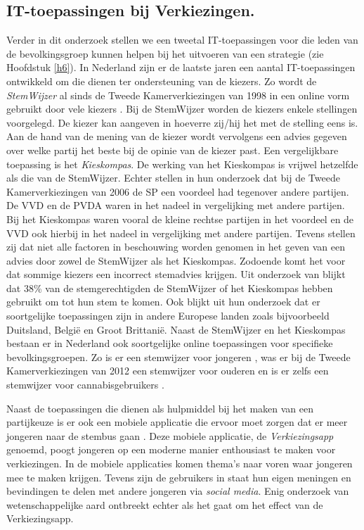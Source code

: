 \subsection{IT-toepassingen bij Verkiezingen.}
Verder in dit onderzoek stellen we een tweetal IT-toepassingen voor die leden van de bevolkingsgroep kunnen helpen bij het uitvoeren van een strategie (zie Hoofdstuk \ref{h6}). In Nederland zijn er de laatste jaren een aantal IT-toepassingen ontwikkeld om die dienen ter ondersteuning van de kiezers. Zo wordt de \textit{StemWijzer} al sinds de Tweede Kamerverkiezingen van 1998 in een online vorm gebruikt door vele kiezers \citep{kleinnijenhuis2007nederland}. Bij de StemWijzer worden de kiezers enkele stellingen voorgelegd. De kiezer kan aangeven in hoeverre zij/hij het met de stelling eens is. Aan de hand van de mening van de kiezer wordt vervolgens een advies gegeven over welke partij het beste bij de opinie van de kiezer past. Een vergelijkbare toepassing is het \textit{Kieskompas}. De werking van het Kieskompas is vrijwel hetzelfde als die van de StemWijzer. Echter stellen \cite{kleinnijenhuis2007nederland} in hun onderzoek dat bij de Tweede Kamerverkiezingen van 2006 de SP een voordeel had tegenover andere partijen. De VVD en de PVDA waren in het nadeel in vergelijking met andere partijen. Bij het Kieskompas waren vooral de kleine rechtse partijen in het voordeel en de VVD ook hierbij in het nadeel in vergelijking met andere partijen. Tevens stellen zij dat niet alle factoren in beschouwing worden genomen in het geven van een advies door zowel de StemWijzer als het Kieskompas. Zodoende komt het voor dat sommige kiezers een incorrect stemadvies krijgen. Uit onderzoek van \cite{garzia2012voting} blijkt dat 38\% van de stemgerechtigden de StemWijzer of het Kieskompas hebben gebruikt om tot hun stem te komen. Ook blijkt uit hun onderzoek dat er soortgelijke toepassingen zijn in andere Europese landen zoals bijvoorbeeld Duitsland, Belgi\"{e} en Groot Brittani\"{e}. Naast de StemWijzer en het Kieskompas bestaan er in Nederland ook soortgelijke online toepassingen voor specifieke bevolkingsgroepen. Zo is er een stemwijzer voor jongeren \citep{Jonge36:online}, was er bij de Tweede Kamerverkiezingen van 2012 een stemwijzer voor ouderen \citep{Stemw79:online,Stemw68:online} en is er zelfs een stemwijzer voor cannabisgebruikers \citep{Canna56:online}.

Naast de toepassingen die dienen als hulpmiddel bij het maken van een partijkeuze is er ook een mobiele applicatie die ervoor moet zorgen dat er meer jongeren naar de stembus gaan \citep{Verki80:online}. Deze mobiele applicatie, de \textit{Verkiezingsapp} genoemd, poogt jongeren op een moderne manier enthousiast te maken voor verkiezingen. In de mobiele applicaties komen thema's naar voren waar jongeren mee te maken krijgen. Tevens zijn de gebruikers in staat hun eigen meningen en bevindingen te delen met andere jongeren via \textit{social media}. Enig onderzoek van wetenschappelijke aard ontbreekt echter als het gaat om het effect van de Verkiezingsapp. 

